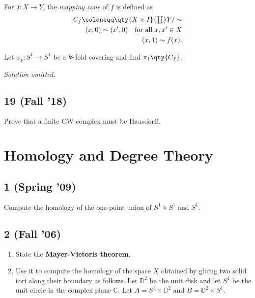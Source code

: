 For \(f:X\to Y\), the \emph{mapping cone} of \(f\) is defined as
\begin{align*}  
C_f \coloneqq\qty{X\times I} {\textstyle\coprod}Y/\sim \\
(x, 0) \sim (x', 0) \quad \text{for all }x, x'\in X\\
(x, 1) \sim f(x)
.\end{align*}

Let \(\phi_k: S^1\to S^1\) be a \(k{\hbox{-}}\)fold covering and find
\(\pi_1\qty{C_f}\).


\emph{Solution omitted.}

\hypertarget{fall-18-3}{%
\subsection{19 (Fall '18)}\label{fall-18-3}}

Prove that a finite CW complex must be Hausdorff.

\hypertarget{homology-and-degree-theory}{%
\section{Homology and Degree Theory}\label{homology-and-degree-theory}}

\hypertarget{spring-09-4}{%
\subsection{1 (Spring '09)}\label{spring-09-4}}

Compute the homology of the one-point union of \(S^1 \times S^1\) and
\(S^1\).

\hypertarget{fall-06-1}{%
\subsection{2 (Fall '06)}\label{fall-06-1}}

\begin{enumerate}
\def\labelenumi{\alph{enumi}.}
\item
  State the \textbf{Mayer-Vietoris theorem}.
\item
  Use it to compute the homology of the space \(X\) obtained by gluing
  two solid tori along their boundary as follows. Let \({\mathbb{D}}^2\)
  be the unit disk and let \(S^1\) be the unit circle in the complex
  plane \({\mathbb{C}}\). Let \(A = S^1 \times {\mathbb{D}}^2\) and
  \(B = {\mathbb{D}}^2 \times S^1\).
\end{enumerate}

